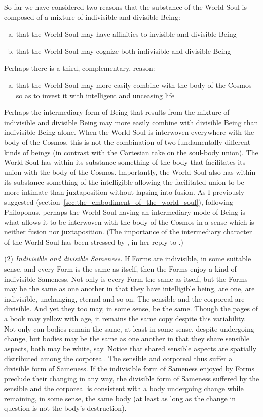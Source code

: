 So far we have considered two reasons that the substance of the World Soul is composed of a mixture of indivisible and divisible Being:
\begin{enumerate}[(a)]
	\item that the World Soul may have affinities to invisible and divisible Being
	\item that the World Soul may cognize both indivisible and divisible Being
\end{enumerate}
Perhaps there is a third, complementary, reason:
\begin{enumerate}[(c)]
	\item that the World Soul may more easily combine with the body of the Cosmos so as to invest it with intelligent and unceasing life
\end{enumerate}
Perhaps the intermediary form of Being that results from the mixture of indivisible and divisible Being may more easily combine with divisible Being than indivisible Being alone. When the World Soul is interwoven everywhere with the body of the Cosmos, this is not the combination of two fundamentally different kinds of beings (in contrast with the Cartesian take on the soul-body union). The World Soul has within its substance something of the body that facilitates its union with the body of the Cosmos. Importantly, the World Soul also has within its substance something of the intelligible allowing the facilitated union to be more intimate than juxtaposition without lapsing into fusion. As I previously suggested (section~\ref{sec:the_embodiment_of_the_world_soul}), following Philoponus, perhaps the World Soul having an intermediary mode of Being is what allows it to be interwoven with the body of the Cosmos in a sense which is neither fusion nor juxtaposition. (The importance of the intermediary character of the World Soul has been stressed by \citealt[182--3]{Miller:1997up}, in her reply to \citealt{Brisson:1997qr}.)

(2) \emph{Indivisible and divisible Sameness.} If Forms are indivisible, in some suitable sense, and every Form is the same as itself, then the Forms enjoy a kind of indivisible Sameness. Not only is every Form the same as itself, but the Forms may be the same as one another in that they have intelligible being, are one, are indivisible, unchanging, eternal and so on. The sensible and the corporeal are divisible. And yet they too may, in some sense, be the same. Though the pages of a book may yellow with age, it remains the same copy despite this variability. Not only can bodies remain the same, at least in some sense, despite undergoing change, but bodies may be the same as one another in that they share sensible aspects, both may be white, say. Notice that shared sensible aspects are spatially distributed among the corporeal. The sensible and corporeal thus suffer a divisible form of Sameness. If the indivisible form of Sameness enjoyed by Forms preclude their changing in any way, the divisible form of Sameness suffered by the sensible and the corporeal is consistent with a body undergoing change while remaining, in some sense, the same body (at least as long as the change in question is not the body's destruction).

